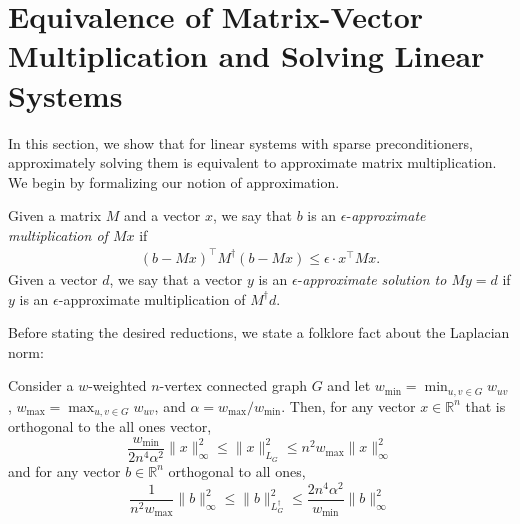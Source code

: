 \section{Equivalence of Matrix-Vector Multiplication and Solving Linear Systems} \label{sec:equivalence}

In this section, we show that for linear systems with sparse preconditioners, approximately solving them is equivalent to approximate matrix multiplication. We begin by formalizing our notion of approximation.

\begin{definition} \label{def:approxmult}
Given a matrix $M$ and a vector $x$, we say that $b$ is an $\epsilon$-\emph{approximate multiplication of $Mx$} if
\begin{align*}
(b - Mx)^\top M^{\dag}(b - Mx)\le \epsilon \cdot x^\top Mx.
\end{align*}
Given a vector $d$, we say that a vector $y$ is an $\epsilon$-\emph{approximate solution to $My = d$} if $y$ is an $\epsilon$-approximate multiplication of $M^{\dag}d$.
\end{definition}

Before stating the desired reductions, we state a folklore fact about the Laplacian norm:
\begin{proposition}\label{prop:lapl-apx}
Consider a $w$-weighted $n$-vertex connected graph $G$ and let $w_{\min} = \min_{u,v\in G} w_{uv}$, $w_{\max} = \max_{u,v\in G} w_{uv}$, and $\alpha = w_{\max}/w_{\min}$. Then, for any vector $x\in \mathbb{R}^n$ that is orthogonal to the all ones vector,
$$ 
\frac{w_{\min}}{2n^4 \alpha^2} \|x\|_{\infty}^2 \le \|x\|_{L_G}^2 \le n^2 w_{\max} \|x\|_{\infty}^2
$$
and for any vector $b\in \mathbb{R}^n$ orthogonal to all ones,
$$
\frac{1}{n^2 w_{\max}} \|b\|_{\infty}^2 \le \|b\|_{L_G^{\dag}}^2 \le  \frac{2n^4 \alpha^2}{w_{\min}} \|b\|_{\infty}^2
$$
\end{proposition}

